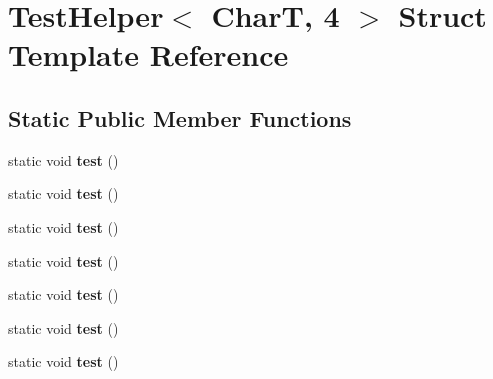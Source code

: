 \hypertarget{struct_test_helper_3_01_char_t_00_014_01_4}{}\section{Test\+Helper$<$ CharT, 4 $>$ Struct Template Reference}
\label{struct_test_helper_3_01_char_t_00_014_01_4}
\subsection*{Static Public Member Functions}
\begin{DoxyCompactItemize}
\item 
\mbox{\label{struct_test_helper_3_01_char_t_00_014_01_4_aed3841fbe0b9aba57fdbdcd831152de3}} 
static void {\bfseries test} ()
\item 
\mbox{\label{struct_test_helper_3_01_char_t_00_014_01_4_a1603ccbafd4b98d60c9c5e4796edd040}} 
static void {\bfseries test} ()
\item 
\mbox{\label{struct_test_helper_3_01_char_t_00_014_01_4_a1603ccbafd4b98d60c9c5e4796edd040}} 
static void {\bfseries test} ()
\item 
\mbox{\label{struct_test_helper_3_01_char_t_00_014_01_4_a1603ccbafd4b98d60c9c5e4796edd040}} 
static void {\bfseries test} ()
\item 
\mbox{\label{struct_test_helper_3_01_char_t_00_014_01_4_a1603ccbafd4b98d60c9c5e4796edd040}} 
static void {\bfseries test} ()
\item 
\mbox{\label{struct_test_helper_3_01_char_t_00_014_01_4_a1603ccbafd4b98d60c9c5e4796edd040}} 
static void {\bfseries test} ()
\item 
\mbox{\label{struct_test_helper_3_01_char_t_00_014_01_4_a1603ccbafd4b98d60c9c5e4796edd040}} 
static void {\bfseries test} ()
\end{DoxyCompactItemize}


